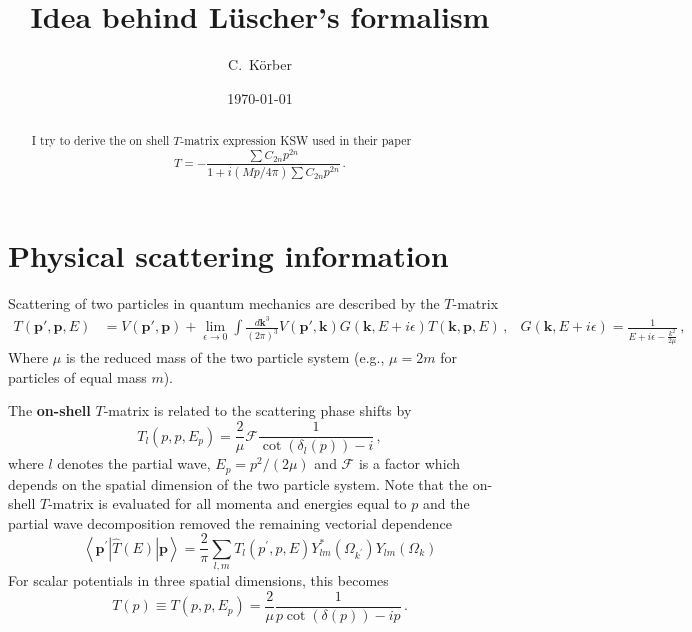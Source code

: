 \documentclass[
    aps,
    prl,
    showkeys,
    nofootinbib,
    floatfix
]{revtex4}
\renewcommand{\vec}[1]{\boldsymbol{#1}}
\begin{document}
\title{Idea behind Lüscher's formalism}

\author{C.~Körber}

\date{\today}

\begin{abstract}%
	I try to derive the on shell $T$-matrix expression KSW used in their paper
	$$
		T =-\frac{\sum C_{2 n} p^{2 n}}{1+i(M p / 4 \pi) \sum C_{2 n} p^{2 n}} \, .
	$$
\end{abstract}

\maketitle

\section{Physical scattering information}

Scattering of two particles in quantum mechanics are described by the $T$-matrix 
\begin{align}
	T(\vec p', \vec p, E)
	&=
	V(\vec p', \vec p) + \lim\limits_{\epsilon \to 0}\int \frac{d \vec k^3}{(2\pi)^3} V(\vec p', \vec k) G(\vec k, E + i \epsilon) T(\vec k, \vec p, E) \, ,
	&
	G(\vec k, E+ i \epsilon) = \frac{1}{E + i \epsilon - \frac{k^2}{2\mu}}
	\, ,
\end{align}
Where $\mu$ is the reduced mass of the two particle system (e.g., $\mu = 2 m$ for particles of equal mass $m$).

The \textbf{on-shell} $T$-matrix is related to the scattering phase shifts by
\begin{equation}
	T_l(p, p , E_p) = \frac{2}{\mu} \mathcal F \frac{1}{\cot (\delta_l(p)) - i} \, ,
\end{equation}
where $l$ denotes the partial wave, $E_p = p^2 / (2 \mu)$ and $\mathcal F$ is a factor which depends on the spatial dimension of the two particle system.
Note that the on-shell $T$-matrix is evaluated for all momenta and energies equal to $p$ and the partial wave decomposition removed the remaining vectorial dependence
\begin{equation}
	\left\langle \vec{p}^{\prime}| \hat T(E) | \vec{p}\right\rangle=\frac{2}{\pi} \sum_{l, m} T_{l}\left(p^{\prime}, p, E\right) Y_{l m}^{*}\left(\Omega_{k^{\prime}}\right) Y_{l m}\left(\Omega_{k}\right)
\end{equation}
For scalar potentials in three spatial dimensions, this becomes
\begin{equation}\label{eq-phase-shifts}
	T(p) \equiv T(p, p, E_p) = \frac{2}{\mu} \frac{1}{p\cot (\delta(p)) - ip} \, .
\end{equation}
\end{document}

